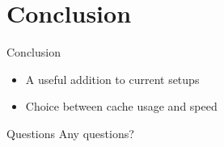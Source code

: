 \documentclass[xcolor=svgnames]{beamer}
\begin{document}
\section{Conclusion}

\begin{frame}{Conclusion}
  \begin{itemize}
      \item A useful addition to current setups
      \item Choice between cache usage and speed
  \end{itemize}
\end{frame}


\begin{frame}{Questions}
    Any questions?


\end{frame}
\end{document}
